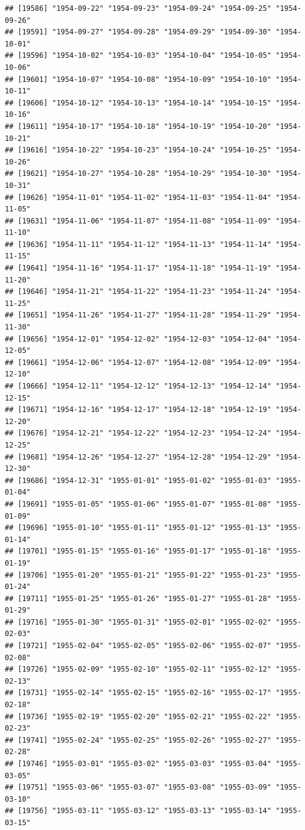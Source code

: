 \documentclass{article}\usepackage[]{graphicx}\usepackage[]{color}
\makeatletter
\newenvironment{kframe}{%
 \def\at@end@of@kframe{}%
 \ifinner\ifhmode%
  \def\at@end@of@kframe{\end{minipage}}%
  \begin{minipage}{\columnwidth}%
 \fi\fi%
 \def\FrameCommand##1{\hskip\@totalleftmargin \hskip-\fboxsep
 \colorbox{shadecolor}{##1}\hskip-\fboxsep
     \hskip-\linewidth \hskip-\@totalleftmargin \hskip\columnwidth}%
 \MakeFramed {\advance\hsize-\width
   \@totalleftmargin\z@ \linewidth\hsize
   \@setminipage}}%
 {\par\unskip\endMakeFramed%
 \at@end@of@kframe}
\newenvironment{knitrout}{}{} %
\makeatother
\begin{document}
\begin{description}
\begin{knitrout}
\begin{kframe}
\begin{verbatim}
## [19586] "1954-09-22" "1954-09-23" "1954-09-24" "1954-09-25" "1954-09-26"
## [19591] "1954-09-27" "1954-09-28" "1954-09-29" "1954-09-30" "1954-10-01"
## [19596] "1954-10-02" "1954-10-03" "1954-10-04" "1954-10-05" "1954-10-06"
## [19601] "1954-10-07" "1954-10-08" "1954-10-09" "1954-10-10" "1954-10-11"
## [19606] "1954-10-12" "1954-10-13" "1954-10-14" "1954-10-15" "1954-10-16"
## [19611] "1954-10-17" "1954-10-18" "1954-10-19" "1954-10-20" "1954-10-21"
## [19616] "1954-10-22" "1954-10-23" "1954-10-24" "1954-10-25" "1954-10-26"
## [19621] "1954-10-27" "1954-10-28" "1954-10-29" "1954-10-30" "1954-10-31"
## [19626] "1954-11-01" "1954-11-02" "1954-11-03" "1954-11-04" "1954-11-05"
## [19631] "1954-11-06" "1954-11-07" "1954-11-08" "1954-11-09" "1954-11-10"
## [19636] "1954-11-11" "1954-11-12" "1954-11-13" "1954-11-14" "1954-11-15"
## [19641] "1954-11-16" "1954-11-17" "1954-11-18" "1954-11-19" "1954-11-20"
## [19646] "1954-11-21" "1954-11-22" "1954-11-23" "1954-11-24" "1954-11-25"
## [19651] "1954-11-26" "1954-11-27" "1954-11-28" "1954-11-29" "1954-11-30"
## [19656] "1954-12-01" "1954-12-02" "1954-12-03" "1954-12-04" "1954-12-05"
## [19661] "1954-12-06" "1954-12-07" "1954-12-08" "1954-12-09" "1954-12-10"
## [19666] "1954-12-11" "1954-12-12" "1954-12-13" "1954-12-14" "1954-12-15"
## [19671] "1954-12-16" "1954-12-17" "1954-12-18" "1954-12-19" "1954-12-20"
## [19676] "1954-12-21" "1954-12-22" "1954-12-23" "1954-12-24" "1954-12-25"
## [19681] "1954-12-26" "1954-12-27" "1954-12-28" "1954-12-29" "1954-12-30"
## [19686] "1954-12-31" "1955-01-01" "1955-01-02" "1955-01-03" "1955-01-04"
## [19691] "1955-01-05" "1955-01-06" "1955-01-07" "1955-01-08" "1955-01-09"
## [19696] "1955-01-10" "1955-01-11" "1955-01-12" "1955-01-13" "1955-01-14"
## [19701] "1955-01-15" "1955-01-16" "1955-01-17" "1955-01-18" "1955-01-19"
## [19706] "1955-01-20" "1955-01-21" "1955-01-22" "1955-01-23" "1955-01-24"
## [19711] "1955-01-25" "1955-01-26" "1955-01-27" "1955-01-28" "1955-01-29"
## [19716] "1955-01-30" "1955-01-31" "1955-02-01" "1955-02-02" "1955-02-03"
## [19721] "1955-02-04" "1955-02-05" "1955-02-06" "1955-02-07" "1955-02-08"
## [19726] "1955-02-09" "1955-02-10" "1955-02-11" "1955-02-12" "1955-02-13"
## [19731] "1955-02-14" "1955-02-15" "1955-02-16" "1955-02-17" "1955-02-18"
## [19736] "1955-02-19" "1955-02-20" "1955-02-21" "1955-02-22" "1955-02-23"
## [19741] "1955-02-24" "1955-02-25" "1955-02-26" "1955-02-27" "1955-02-28"
## [19746] "1955-03-01" "1955-03-02" "1955-03-03" "1955-03-04" "1955-03-05"
## [19751] "1955-03-06" "1955-03-07" "1955-03-08" "1955-03-09" "1955-03-10"
## [19756] "1955-03-11" "1955-03-12" "1955-03-13" "1955-03-14" "1955-03-15"

\end{verbatim}
\end{kframe}
\end{knitrout}
\end{description}
\end{document}
